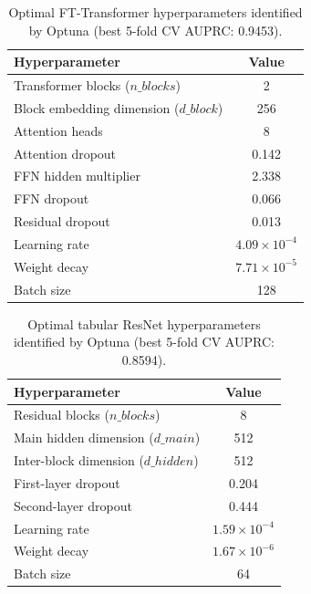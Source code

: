 \documentclass[final,3p,times]{elsarticle}
\begin{document}
\begin{table}[H]
\centering
\caption{Optimal FT-Transformer hyperparameters identified by
Optuna (best 5-fold CV AUPRC: 0.9453).}
\label{tab:ftt_hyperparams}
\small
\begin{tabular}{lc}
\toprule
\textbf{Hyperparameter} & \textbf{Value} \\
\midrule
Transformer blocks ($n\_blocks$)        & 2 \\
Block embedding dimension ($d\_block$)  & 256 \\
Attention heads                         & 8 \\
Attention dropout                       & 0.142 \\
FFN hidden multiplier                   & 2.338 \\
FFN dropout                             & 0.066 \\
Residual dropout                        & 0.013 \\
Learning rate                           & $4.09 \times 10^{-4}$ \\
Weight decay                            & $7.71 \times 10^{-5}$ \\
Batch size                              & 128 \\
\bottomrule
\end{tabular}
\end{table}

\begin{table}[H]
\centering
\caption{Optimal tabular ResNet hyperparameters identified by
Optuna (best 5-fold CV AUPRC: 0.8594).}
\label{tab:resnet_hyperparams}
\small
\begin{tabular}{lc}
\toprule
\textbf{Hyperparameter} & \textbf{Value} \\
\midrule
Residual blocks ($n\_blocks$)           & 8 \\
Main hidden dimension ($d\_main$)       & 512 \\
Inter-block dimension ($d\_hidden$)     & 512 \\
First-layer dropout                     & 0.204 \\
Second-layer dropout                    & 0.444 \\
Learning rate                           & $1.59 \times 10^{-4}$ \\
Weight decay                            & $1.67 \times 10^{-6}$ \\
Batch size                              & 64 \\
\bottomrule
\end{tabular}
\end{table}
\end{document}
